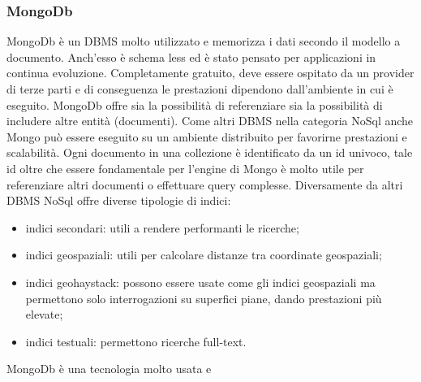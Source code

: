 \subsubsection*{MongoDb}
MongoDb è un DBMS molto utilizzato e memorizza i dati secondo il modello a documento. Anch'esso è schema less ed è stato pensato per applicazioni in continua evoluzione. Completamente gratuito, deve essere ospitato da un provider di terze parti e di conseguenza le prestazioni dipendono dall'ambiente in cui è eseguito. 
MongoDb offre sia la possibilità di referenziare sia la possibilità di includere altre entità (documenti). 
Come altri DBMS nella categoria NoSql anche Mongo può essere eseguito su un ambiente distribuito per favorirne prestazioni e scalabilità. Ogni documento in una collezione è identificato da un id univoco, tale id oltre che essere fondamentale per l'engine di Mongo è molto utile per referenziare altri documenti o effettuare query complesse.
Diversamente da altri DBMS NoSql offre diverse tipologie di indici:
\begin{itemize}
	\item indici secondari: utili a rendere performanti le ricerche;
	\item indici geospaziali: utili per calcolare distanze tra coordinate geospaziali;
	\item indici geohaystack: possono essere usate come gli indici geospaziali ma permettono solo interrogazioni su superfici piane, dando prestazioni più elevate;
	\item indici testuali: permettono ricerche full-text.
\end{itemize} 
MongoDb è una tecnologia molto usata e 

